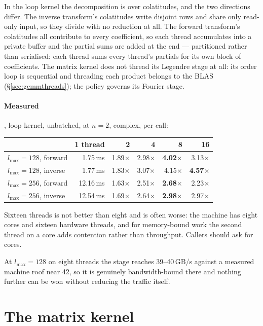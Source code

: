 \documentclass[11pt,a4paper]{article}
\begin{document}
In the loop kernel the decomposition is over colatitudes, and the two
directions differ.  The inverse transform's colatitudes write disjoint
rows and share only read-only input, so they divide with no reduction at
all.  The forward transform's colatitudes all contribute to every
coefficient, so each thread accumulates into a private buffer and the
partial sums are added at the end --- partitioned rather than serialised:
each thread sums every thread's partials for its own block of
coefficients.  The matrix kernel does not thread its Legendre stage at
all: its order loop is sequential and threading each product belongs to
the BLAS (\S\ref{sec:gemmthreads}); the policy governs its Fourier stage.

\paragraph{Measured}, loop kernel, unbatched, at $n=2$, complex, per call:
\begin{center}
\begin{tabular}{lrrrrr}
  \toprule
  & 1 thread & 2 & 4 & 8 & 16 \\
  \midrule
  $l_{\max}=128$, forward & 1.75\,ms & 1.89$\times$ & 2.98$\times$ & \textbf{4.02$\times$} & 3.13$\times$ \\
  $l_{\max}=128$, inverse & 1.77\,ms & 1.83$\times$ & 3.07$\times$ & 4.15$\times$ & \textbf{4.57$\times$} \\
  $l_{\max}=256$, forward & 12.16\,ms & 1.63$\times$ & 2.51$\times$ & \textbf{2.68$\times$} & 2.23$\times$ \\
  $l_{\max}=256$, inverse & 12.54\,ms & 1.69$\times$ & 2.64$\times$ & \textbf{2.98$\times$} & 2.97$\times$ \\
  \bottomrule
\end{tabular}
\end{center}

Sixteen threads is not better than eight and is often worse: the machine
has eight cores and sixteen hardware threads, and for memory-bound work
the second thread on a core adds contention rather than throughput.
Callers should ask for cores.

At $l_{\max}=128$ on eight threads the stage reaches 39--40\,GB/s against
a measured machine roof near 42, so it is genuinely bandwidth-bound there
and nothing further can be won without reducing the traffic itself.

\section{The matrix kernel}
\label{sec:gemm}
\end{document}
